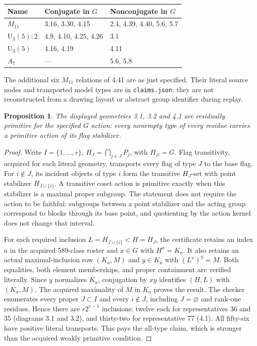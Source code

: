 \documentclass[11pt]{article}
\newtheorem{proposition}{Proposition}
\begin{document}
\begin{center}\begin{tabular}{lll}\toprule
Name&Conjugate in $G$&Nonconjugate in $G$\\\midrule
$M_{11}$&3.16, 3.30, 4.15&2.4, 4.39, 4.40, 5.6, 5.7\\
$\mathrm U_3(5):2$&4.9, 4.10, 4.25, 4.26&3.1\\
$\mathrm U_3(5)$&4.16, 4.19&4.11\\
$A_7$&---&5.6, 5.8\\\bottomrule
\end{tabular}\end{center}
The additional six $M_{11}$ relations of 4.41 are as just specified.
Their literal source nodes and transported model types are in
\texttt{claims.json}; they are not reconstructed from a drawing layout
or abstract group identifier during replay.

\begin{proposition}
The displayed geometries 3.1, 3.2 and 4.1 are residually primitive
for the specified $G$ action: every nonempty type of every residue
carries a primitive action of its flag stabilizer.
\end{proposition}
\begin{proof}
Write $I=\{1,\ldots,r\}$, $H_J=\bigcap_{j\in J}P_j$, with
$H_\varnothing=G$. Flag transitivity, acquired for each literal
geometry, transports every flag of type $J$ to the base flag. For
$i\notin J$, its incident objects of type $i$ form the transitive
$H_J$-set with point stabilizer $H_{J\cup\{i\}}$. A transitive coset
action is primitive exactly when this stabilizer is a maximal proper
subgroup. The statement does not require the action to be faithful:
subgroups between a point stabilizer and the acting group correspond
to blocks through its base point, and quotienting by the action kernel
does not change that interval.

For each required inclusion $L=H_{J\cup\{i\}}<H=H_J$, the certificate
retains an index $a$ in the acquired 589-class roster and $x\in G$ with
$H^x=K_a$. It also retains an actual maximal-inclusion row $(K_a,M)$
and $y\in K_a$ with $(L^x)^y=M$. Both equalities, both element
memberships, and proper containment are verified literally. Since
$y$ normalizes $K_a$, conjugation by $xy$ identifies $(H,L)$ with
$(K_a,M)$. The acquired maximality of $M$ in $K_a$ proves the result.
The checker enumerates every proper $J\subset I$ and every $i\notin J$,
including $J=\varnothing$ and rank-one residues. Hence there are
$r2^{r-1}$ inclusions: twelve each for representatives 36 and 35
(diagrams 3.1 and 3.2), and thirty-two for representative 77 (4.1).
All fifty-six have positive literal transports. This pays the all-type
claim, which is stronger than the acquired weakly primitive condition.
\end{proof}
\end{document}
